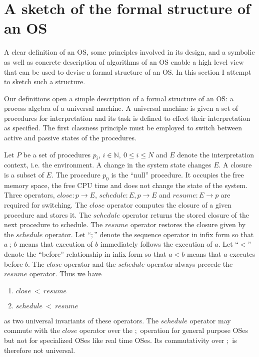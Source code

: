 \documentclass[draft]{article}
\begin{document}
\section{A sketch of the formal structure of an OS}
\label{sec:os:theory:sketch}

A clear definition  of an OS, some principles  involved in its design,
and a symbolic as well as  concrete description of algorithms of an OS
enable a high level view that can be used to devise a formal structure
of an OS.  In this section I attempt to sketch such a structure.

Our definitions open a simple  description of a formal structure of an
OS: a process algebra of  a universal machine.  A universal machine is
given a set  of procedures for interpretation and  its task is defined
to  effect their  interpretation  as specified.   The first  classness
principle must be employed to switch between active and passive states
of   the  procedures.   

Let $P$ be a set of procedures  $p_i$, $i \in \mathbb{N},\ 0 \le i \le
N$ and $E$ denote the interpretation context, i.e. the environment.  A
change in the system state changes $E$.  A closure is a subset of $E$.
The procedure $p_0$  is the ``null'' procedure.  It  occupies the free
memory space, the  free CPU time and does not change  the state of the
system.  Three  operators, $close: p  \rightarrow E$, $schedule:  E, p
\rightarrow  E$  and  $resume:  E  \rightarrow  p$  are  required  for
switching.   The $close$  operator  computes the  closure  of a  given
procedure and  stores it.  The $schedule$ operator  returns the stored
closure  of the  next procedure  to schedule.   The  $resume$ operator
restores the  closure given by  the $schedule$ operator.   Let ``$;$''
denote the  sequence operator in  infix form so  that $a\ ;\  b$ means
that execution of  $b$ immediately follows the execution  of $a$.  Let
``$<$'' denote the ``before'' relationship  in infix form so that $a <
b$ means that  $a$ executes before $b$.  The  $close$ operator and the
$schedule$  operator always  precede the  $resume$ operator.   Thus we
have
\begin{enumerate}
\item $close\ <\ resume$
\item $schedule\ <\ resume$
\end{enumerate}
as  two  universal  invariants  of these  operators.   The  $schedule$
operator may commute with the  $close$ operator over the $;$ operation
for general purpose  OSes but not for specialized  OSes like real time
OSes.  Its commutativity over $;$ is therefore not universal.
\end{document}
